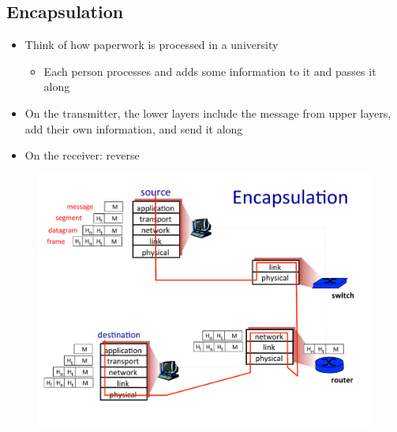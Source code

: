 \subsection{Encapsulation}
\begin{itemize}[nosep]
    \item Think of how paperwork is processed in a university
          \begin{itemize}[nosep]
              \item Each person processes and adds some information to it and passes it along
          \end{itemize}
    \item On the transmitter, the lower layers include the message from upper layers, add their own information, and send it along
    \item On the receiver: reverse
\end{itemize}
\begin{figure}[H]
    \includegraphics[width=\textwidth]{lazy/encapsulation.pdf}
\end{figure}